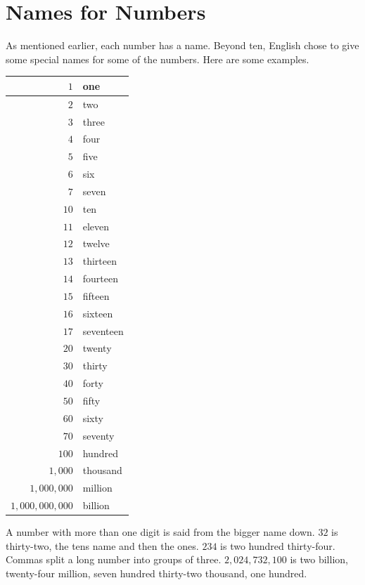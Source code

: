 \section{Names for Numbers}

As mentioned earlier, each number has a name. Beyond ten, English chose to give some special names for some of the numbers. Here are some examples.

\begin{center}
\setlength{\tabcolsep}{0.8em}
\begin{tabular}{|r|l|}
\hline
$1$ & one \\
\hline
$2$ & two \\
\hline
$3$ & three \\
\hline
$4$ & four \\
\hline
$5$ & five \\
\hline
$6$ & six \\
\hline
$7$ & seven \\
\hline
$10$ & ten \\
\hline
$11$ & eleven \\
\hline
$12$ & twelve \\
\hline
$13$ & thirteen \\
\hline
$14$ & fourteen \\
\hline
$15$ & fifteen \\
\hline
$16$ & sixteen \\
\hline
$17$ & seventeen \\
\hline
$20$ & twenty \\
\hline
$30$ & thirty \\
\hline
$40$ & forty \\
\hline
$50$ & fifty \\
\hline
$60$ & sixty \\
\hline
$70$ & seventy \\
\hline
$100$ & hundred \\
\hline
$1{,}000$ & thousand\index{thousand} \\
\hline
$1{,}000{,}000$ & million\index{million} \\
\hline
$1{,}000{,}000{,}000$ & billion\index{billion} \\
\hline
\end{tabular}
\end{center}

A number with more than one digit is said from the bigger name down. $32$ is thirty-two, the tens name and then the ones. $234$ is two hundred thirty-four. Commas split a long number into groups of three. $2{,}024{,}732{,}100$ is two billion, twenty-four million, seven hundred thirty-two thousand, one hundred.

